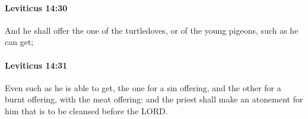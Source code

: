 		\paragraph{Leviticus 14:30} %
			\label{LEVITICUS-14-30}

			And he shall offer the one of the turtledoves, or of the young pigeons, such as he can get;


		\paragraph{Leviticus 14:31} %
			\label{LEVITICUS-14-31}

			Even such as he is able to get, the one for a sin offering, and the other for a burnt offering, with the meat offering: and the priest shall make an atonement for him that is to be cleansed before the LORD.


